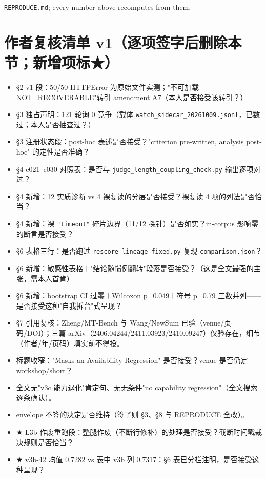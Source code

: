 \documentclass[11pt,a4paper]{article}
\begin{document}
\texttt{REPRODUCE.md}; every number above recomputes from them.

\section*{作者复核清单 v1（逐项签字后删除本节；新增项标★）}
\begin{itemize}
\item  §2 v1 段：50/50 HTTPError 为原始文件实测；"不可加载 NOT\_RECOVERABLE"转引 amendment A7（本人是否接受该转引？）
\item  §3 独占声明：121 轮询 0 竞争（载体 \texttt{watch\_sidecar\_20261009.jsonl}，已数过；本人是否抽查过？）
\item  §3 注册状态段：post-hoc 表述是否接受？"criterion pre-written, analysis post-hoc" 的定性是否准确？
\item  §4 c021–c030 对照表：是否与 \texttt{judge\_length\_coupling\_check.py} 输出逐项对过？
\item  §4 新增：12 实质诊断 vs 4 裸复读的分层是否接受？裸复读 4 项的列法是否恰当？
\item  §4 新增：裸 \texttt{"timeout"} 碎片边界（11/12 探针）是否如实？in-corpus 影响零的断言是否接受？
\item  §6 表格三行：是否跑过 \texttt{rescore\_lineage\_fixed.py} 复现 \texttt{comparison.json}？
\item  §6 新增：敏感性表格＋"结论随惯例翻转"段落是否接受？（这是全文最强的主张，需本人首肯）
\item  §6 新增：bootstrap CI 过零＋Wilcoxon p=0.049＋符号 p=0.79 三数并列——是否接受这种"自我拆台"式呈现？
\item  §7 引用复核：Zheng/MT-Bench 与 Wang/NewSum 已验（venue/页码/DOI）；三篇 arXiv（2406.04244/2411.03923/2410.09247）仅验存在，细节（作者/年/页码）填实前不得投。
\item  标题收窄："Masks an Availability Regression" 是否接受？venue 是否仍定 workshop/short？
\item  全文无"v3c 能力退化"肯定句、无无条件"no capability regression"（全文搜索逐条确认）。
\item  envelope 不签的决定是否维持（签了则 §3、§8 与 REPRODUCE 全改）。
\item  ★ L3b 作废重跑段：整腿作废（不断行修补）的处理是否接受？截断时间戳裁决规则是否恰当？
\item  ★ v3b-42 均值 0.7282 vs 表中 v3b 列 0.7317：§6 表已分栏注明，是否接受这种呈现？
\end{itemize}
\end{document}

